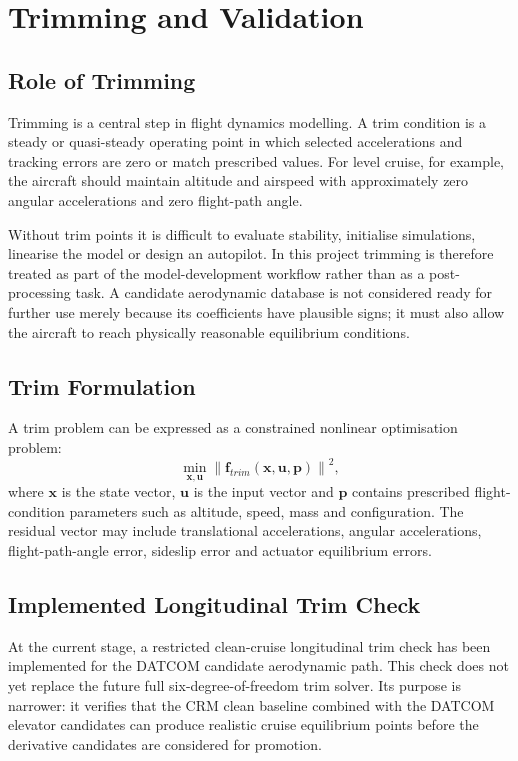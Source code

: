 \chapter{Trimming and Validation}

\section{Role of Trimming}

Trimming is a central step in flight dynamics modelling. A trim condition is a steady or quasi-steady operating point in which selected accelerations and tracking errors are zero or match prescribed values. For level cruise, for example, the aircraft should maintain altitude and airspeed with approximately zero angular accelerations and zero flight-path angle.

Without trim points it is difficult to evaluate stability, initialise simulations, linearise the model or design an autopilot. In this project trimming is therefore treated as part of the model-development workflow rather than as a post-processing task. A candidate aerodynamic database is not considered ready for further use merely because its coefficients have plausible signs; it must also allow the aircraft to reach physically reasonable equilibrium conditions.

\section{Trim Formulation}

A trim problem can be expressed as a constrained nonlinear optimisation problem:
\begin{equation}
    \min_{\bm{x},\bm{u}}
    \left\|
        \bm{f}_{trim}(\bm{x},\bm{u},\bm{p})
    \right\|^2,
\end{equation}
where $\bm{x}$ is the state vector, $\bm{u}$ is the input vector and $\bm{p}$ contains prescribed flight-condition parameters such as altitude, speed, mass and configuration. The residual vector may include translational accelerations, angular accelerations, flight-path-angle error, sideslip error and actuator equilibrium errors.

\section{Implemented Longitudinal Trim Check}

At the current stage, a restricted clean-cruise longitudinal trim check has been implemented for the DATCOM candidate aerodynamic path. This check does not yet replace the future full six-degree-of-freedom trim solver. Its purpose is narrower: it verifies that the CRM clean baseline combined with the DATCOM elevator candidates can produce realistic cruise equilibrium points before the derivative candidates are considered for promotion.

